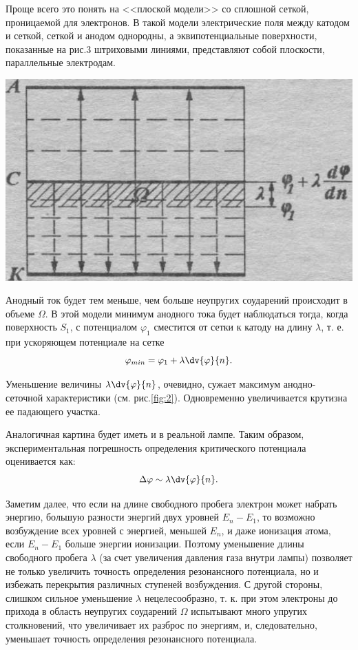 Проще всего это понять на <<плоской модели>> со сплошной сеткой, проницаемой для электронов. В такой модели электрические поля между катодом и сеткой, сеткой и анодом однородны, а эквипотенциальные поверхности, показанные на рис.3 штриховыми линиями, представляют собой плоскости, параллельные электродам.
\begin{center}
    \begin{minipage}[t]{0.5\linewidth}
        \includegraphics[width=\linewidth]{R3.png} 
        \label{fig:3}
        \vspace{-32pt}
    \end{minipage}
\end{center}

Анодный ток будет тем меньше, чем больше неупругих соударений происходит в объеме $\Omega$. В этой модели минимум анодного тока будет наблюдаться тогда, когда поверхность $S_1$, с потенциалом $\varphi_{1}$ сместится от сетки к катоду на длину $\lambda$, т. е. при ускоряющем потенциале на сетке $$\varphi_{min}=\varphi_1+\lambda \dv{\varphi}{n}.$$

Уменьшение величины $\displaystyle\lambda \dv{\varphi}{n}$, очевидно, сужает максимум анодно-сеточной характеристики (см. рис.\ref{fig:2}). Одновременно увеличивается крутизна ее падающего участка.

Аналогичная картина будет иметь и в реальной лампе. Таким образом, экспериментальная погрешность определения критического потенциала оценивается как: $$\Delta \varphi \sim \lambda \dv{\varphi}{n}.$$

Заметим далее, что если на длине свободного пробега электрон может набрать энергию, большую разности энергий двух уровней $E_n-E_1$, то возможно возбуждение всех уровней с
энергией, меньшей $E_n$, и даже ионизация атома, если $E_n-E_1$ больше энергии ионизации. Поэтому уменьшение длины свободного пробега $\lambda$ (за счет увеличения давления газа внутри лампы) позволяет не только увеличить точность определения резонансного потенциала, но и избежать перекрытия различных ступеней возбуждения. С другой стороны, слишком сильное уменьшение $\lambda$ нецелесообразно, т. к. при этом электроны до прихода в область неупругих соударений $\Omega$ испытывают много упругих столкновений, что увеличивает их разброс по энергиям, и, следовательно, уменьшает точность определения резонансного потенциала.

